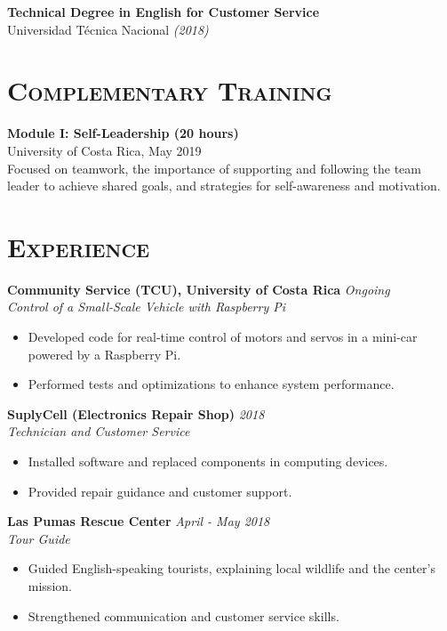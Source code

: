 \documentclass[a4paper,9pt]{article}
\begin{document}
\textbf{Technical Degree in English for Customer Service} \\
Universidad Técnica Nacional \textit{(2018)}

\section*{\textsc{Complementary Training}}
\small
\textbf{Module I: Self-Leadership (20 hours)} \\
University of Costa Rica, May 2019 \\
Focused on teamwork, the importance of supporting and following the team leader to achieve shared goals, 
and strategies for self-awareness and motivation.

\section*{\textsc{Experience}}
\small
\textbf{Community Service (TCU), University of Costa Rica} \hfill \textit{Ongoing} \\
\textit{Control of a Small-Scale Vehicle with Raspberry Pi}  
\begin{itemize}
  \item Developed code for real-time control of motors and servos in a mini-car powered by a Raspberry Pi.
  \item Performed tests and optimizations to enhance system performance.
\end{itemize}

\textbf{SuplyCell (Electronics Repair Shop)} \hfill \textit{2018} \\
\textit{Technician and Customer Service}  
\begin{itemize}
  \item Installed software and replaced components in computing devices.
  \item Provided repair guidance and customer support.
\end{itemize}

\textbf{Las Pumas Rescue Center} \hfill \textit{April - May 2018} \\
\textit{Tour Guide}  
\begin{itemize}
  \item Guided English-speaking tourists, explaining local wildlife and the center’s mission.
  \item Strengthened communication and customer service skills.
\end{itemize}
\end{document}
